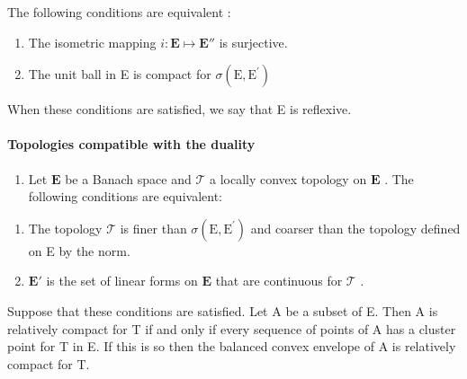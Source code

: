The following conditions are equivalent :

\begin{enumerate}
\def\labelenumi{(\roman{enumi})}
\item
  The isometric mapping \(i:\mathbf{E}\mapsto \mathbf{E}''\) is surjective.
\item
  The unit ball in E is compact for \(\sigma (\mathrm{E},\mathrm{E}^{\prime})\)
\end{enumerate}

When these conditions are satisfied, we say that E is reflexive.

\paragraph{Topologies compatible with the duality}

\begin{enumerate}
\def\labelenumi{\arabic{enumi})}
\setcounter{enumi}{22}
\tightlist
\item
  Let \(\mathbf{E}\) be a Banach space and \(\mathcal{T}\) a locally convex topology on \(\mathbf{E}\) . The following conditions are equivalent:
\end{enumerate}

\begin{enumerate}
\def\labelenumi{(\roman{enumi})}
\item
  The topology \(\mathcal{T}\) is finer than \(\sigma (\mathrm{E},\mathrm{E}^{\prime})\) and coarser than the topology defined on E by the norm.
\item
  \(\mathbf{E}'\) is the set of linear forms on \(\mathbf{E}\) that are continuous for \(\mathcal{T}\) .
\end{enumerate}

Suppose that these conditions are satisfied. Let A be a subset of E. Then A is relatively compact for T if and only if every sequence of points of A has a cluster point for T in E. If this is so then the balanced convex envelope of A is relatively compact for T.

